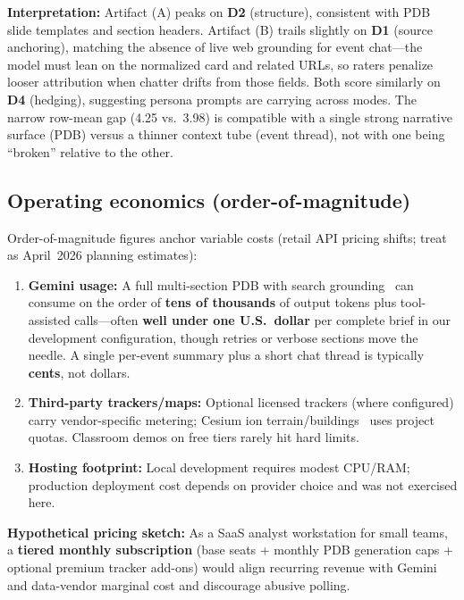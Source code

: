 \textbf{Interpretation:} Artifact (A) peaks on \textbf{D2} (structure), consistent with PDB slide templates and section headers. Artifact (B) trails slightly on \textbf{D1} (source anchoring), matching the absence of live web grounding for event chat---the model must lean on the normalized card and related URLs, so raters penalize looser attribution when chatter drifts from those fields. Both score similarly on \textbf{D4} (hedging), suggesting persona prompts are carrying across modes. The narrow row-mean gap (4.25 vs.\ 3.98) is compatible with a single strong narrative surface (PDB) versus a thinner context tube (event thread), not with one being ``broken'' relative to the other.

\subsection{Operating economics (order-of-magnitude)}

Order-of-magnitude figures anchor variable costs (retail API pricing shifts; treat as April~2026 planning estimates):

\begin{enumerate}[leftmargin=*]
  \item \textbf{Gemini usage:} A full multi-section PDB with search grounding~\cite{gemini-api} can consume on the order of \textbf{tens of thousands} of output tokens plus tool-assisted calls---often \textbf{well under one U.S.\ dollar} per complete brief in our development configuration, though retries or verbose sections move the needle. A single per-event summary plus a short chat thread is typically \textbf{cents}, not dollars.
  \item \textbf{Third-party trackers/maps:} Optional licensed trackers (where configured) carry vendor-specific metering; Cesium ion terrain/buildings~\cite{cesium} uses project quotas. Classroom demos on free tiers rarely hit hard limits.
  \item \textbf{Hosting footprint:} Local development requires modest CPU/RAM; production deployment cost depends on provider choice and was not exercised here.
\end{enumerate}

\textbf{Hypothetical pricing sketch:} As a SaaS analyst workstation for small teams, a \textbf{tiered monthly subscription} (base seats + monthly PDB generation caps + optional premium tracker add-ons) would align recurring revenue with Gemini and data-vendor marginal cost and discourage abusive polling.

